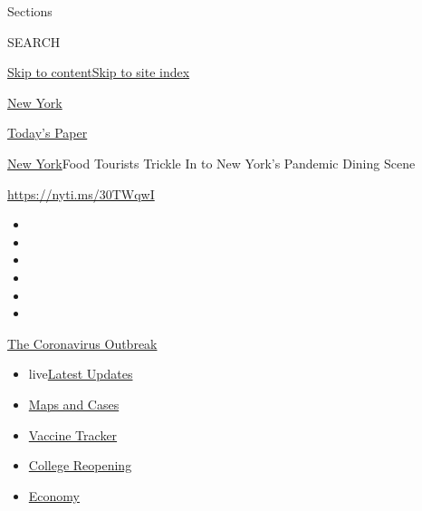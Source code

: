 Sections

SEARCH

\protect\hyperlink{site-content}{Skip to
content}\protect\hyperlink{site-index}{Skip to site index}

\href{https://www.nytimes3xbfgragh.onion/section/nyregion}{New York}

\href{https://myaccount.nytimes3xbfgragh.onion/auth/login?response_type=cookie\&client_id=vi}{}

\href{https://www.nytimes3xbfgragh.onion/section/todayspaper}{Today's
Paper}

\href{/section/nyregion}{New York}\textbar{}Food Tourists Trickle In to
New York's Pandemic Dining Scene

\url{https://nyti.ms/30TWqwI}

\begin{itemize}
\item
\item
\item
\item
\item
\item
\end{itemize}

\href{https://www.nytimes3xbfgragh.onion/news-event/coronavirus?action=click\&pgtype=Article\&state=default\&region=TOP_BANNER\&context=storylines_menu}{The
Coronavirus Outbreak}

\begin{itemize}
\tightlist
\item
  live\href{https://www.nytimes3xbfgragh.onion/2020/08/04/world/coronavirus-cases.html?action=click\&pgtype=Article\&state=default\&region=TOP_BANNER\&context=storylines_menu}{Latest
  Updates}
\item
  \href{https://www.nytimes3xbfgragh.onion/interactive/2020/us/coronavirus-us-cases.html?action=click\&pgtype=Article\&state=default\&region=TOP_BANNER\&context=storylines_menu}{Maps
  and Cases}
\item
  \href{https://www.nytimes3xbfgragh.onion/interactive/2020/science/coronavirus-vaccine-tracker.html?action=click\&pgtype=Article\&state=default\&region=TOP_BANNER\&context=storylines_menu}{Vaccine
  Tracker}
\item
  \href{https://www.nytimes3xbfgragh.onion/2020/08/02/us/covid-college-reopening.html?action=click\&pgtype=Article\&state=default\&region=TOP_BANNER\&context=storylines_menu}{College
  Reopening}
\item
  \href{https://www.nytimes3xbfgragh.onion/live/2020/08/04/business/stock-market-today-coronavirus?action=click\&pgtype=Article\&state=default\&region=TOP_BANNER\&context=storylines_menu}{Economy}
\end{itemize}

